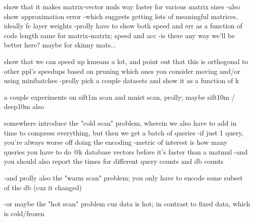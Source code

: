 

show that it makes matrix-vector muls way faster for various matrix sizes
    -also show approximation error
        -which suggests getting lots of meaningful matrices, ideally fc layer weights
    -prolly have to show both speed and err as a function of code length
same for matrix-matrix; speed and acc
    -is there any way we'll be better here? maybe for skinny mats...

show that we can speed up kmeans a lot, and point out that this is orthogonal to other ppl's speedups based on pruning which ones you consider moving and/or using minibatches
    -prolly pick a couple datasets and show it as a function of k

a couple experiments on sift1m scan and mnist scan, prolly; maybe sift10m / deep10m also

somewhere introduce the "cold scan" problem, wherein we also have to add in time to compress everything, but then we get a batch of queries
    -if just 1 query, you're always worse off doing the encoding
    -metric of interest is how many queries you have to do @k database vectors before it's faster than a matmul
        -and you should also report the times for different query counts and db counts

    -and prolly also the "warm scan" problem; you only have to encode some subset of the db (cuz it changed)

    -or maybe the "hot scan" problem cuz data is hot; in contrast to fixed data, which is cold/frozen



